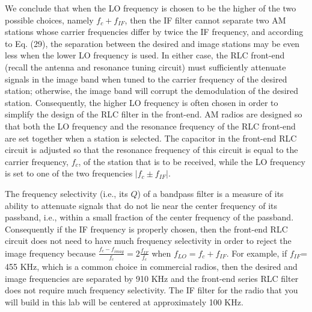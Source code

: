 \documentclass[12pt]{article}
\begin{document}
\par We conclude that when the LO frequency is chosen to be the higher of the two possible choices, namely
$f_c+f_{IF}$, then the IF filter cannot separate two AM stations whose carrier frequencies differ by twice the
IF frequency, and according to Eq. (29), the separation between the desired and image stations may be
even less when the lower LO frequency is used. In either case, the RLC front-end (recall the antenna and
resonance tuning circuit) must sufficiently attenuate signals in the image band when tuned to the carrier
frequency of the desired station; otherwise, the image band will corrupt the demodulation of the desired
station. Consequently, the higher LO frequency is often chosen in order to simplify the design of the RLC
filter in the front-end. AM radios are designed so that both the LO frequency and the resonance frequency
of the RLC front-end are set together when a station is selected. The capacitor in the front-end RLC circuit
is adjusted so that the resonance frequency of this circuit is equal to the carrier frequency, $f_c$, of the station
that is to be received, while the LO frequency is set to one of the two frequencies $|f_c\pm f_{IF}|$.
\par The frequency selectivity (i.e., its $Q$) of a bandpass filter is a measure of its ability to attenuate signals
that do not lie near the center frequency of its passband, i.e., within a small fraction of the center frequency
of the passband. Consequently if the IF frequency is properly chosen, then the front-end RLC circuit does
not need to have much frequency selectivity in order to reject the image frequency because $\frac{f_c-f_{imag}}{f_c}=2\frac{f_{IF}}{f_{c}}$ when $f_{LO}=f_c+f_{IF}$. For example, if $f_{IF}$= 455 KHz, which is a common choice in commercial radios, then the desired and image frequencies are separated by 910 KHz and the front-end series RLC filter does not
require much frequency selectivity. The IF filter for the radio that you will build in this lab will be centered
at approximately 100 KHz.
\end{document}
